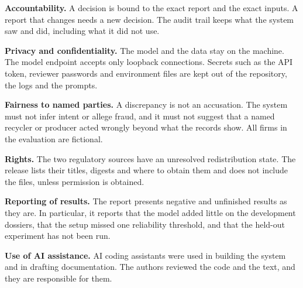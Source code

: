 \textbf{Accountability.} A decision is bound to the exact report and the exact inputs. A report that changes
needs a new decision. The audit trail keeps what the system saw and did, including what it did not use.

\textbf{Privacy and confidentiality.} The model and the data stay on the machine. The model endpoint accepts
only loopback connections. Secrets such as the API token, reviewer passwords and environment files are kept out of
the repository, the logs and the prompts.

\textbf{Fairness to named parties.} A discrepancy is not an accusation. The system must not infer intent or
allege fraud, and it must not suggest that a named recycler or producer acted wrongly beyond what the records show.
All firms in the evaluation are fictional.

\textbf{Rights.} The two regulatory sources have an unresolved redistribution state. The release lists their
titles, digests and where to obtain them and does not include the files, unless permission is obtained.

\textbf{Reporting of results.} The report presents negative and unfinished results as they are. In particular, it
reports that the model added little on the development dossiers, that the setup missed one reliability threshold,
and that the held-out experiment has not been run.

\textbf{Use of AI assistance.} AI coding assistants were used in building the system and in drafting
documentation. The authors reviewed the code and the text, and they are responsible for them.
